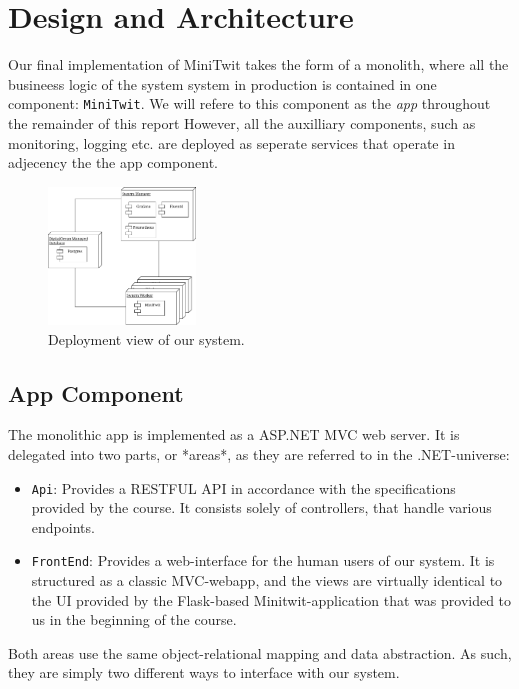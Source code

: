 \section{Design and Architecture}\label{sec:design-arch}

Our final implementation of MiniTwit takes the form of a monolith, where all the busineess logic of the system system in production is contained in one component: \texttt{MiniTwit}. We will refere to this component as the \textit{app} throughout the remainder of this report
However, all the auxilliary components, such as monitoring, logging etc. are deployed as seperate services that operate in adjecency the the app component.

\begin{figure}
  \begin{center}
    \includegraphics[width=0.35\textwidth]{img/deployment.pdf}
  \end{center}
  \caption{Deployment view of our system.}\label{fig:deployment}
\end{figure}


\subsection{App Component}

The monolithic app is implemented as a ASP.NET MVC web server. It is delegated into two parts, or *areas*, as they are referred to in the .NET-universe:

\begin{itemize}
    \item \texttt{Api}: Provides a RESTFUL API in accordance with the specifications provided by the course. It consists solely of controllers, that handle various endpoints.
    \item \texttt{FrontEnd}: Provides a web-interface for the human users of our system. It is structured as a classic MVC-webapp, and the views are virtually identical to the UI provided by the Flask-based Minitwit-application that was provided to us in the beginning of the course.
\end{itemize}

Both areas use the same object-relational mapping and data abstraction. As such, they are simply two different ways to interface with our system.

 



